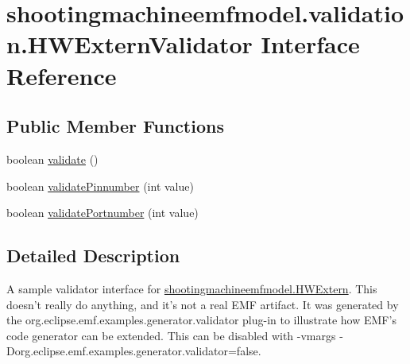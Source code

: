 \hypertarget{interfaceshootingmachineemfmodel_1_1validation_1_1_h_w_extern_validator}{\section{shootingmachineemfmodel.\-validation.\-H\-W\-Extern\-Validator Interface Reference}
\label{interfaceshootingmachineemfmodel_1_1validation_1_1_h_w_extern_validator}
}
\subsection*{Public Member Functions}
\begin{DoxyCompactItemize}
\item 
boolean \hyperlink{interfaceshootingmachineemfmodel_1_1validation_1_1_h_w_extern_validator_a9058e968627a636b5aaf06147a04384b}{validate} ()
\item 
boolean \hyperlink{interfaceshootingmachineemfmodel_1_1validation_1_1_h_w_extern_validator_a49e54ec2c3cfe73f5067fd7897bc84af}{validate\-Pinnumber} (int value)
\item 
boolean \hyperlink{interfaceshootingmachineemfmodel_1_1validation_1_1_h_w_extern_validator_a83a1402705a0aa6d021d65f128fd537f}{validate\-Portnumber} (int value)
\end{DoxyCompactItemize}


\subsection{Detailed Description}
A sample validator interface for \hyperlink{interfaceshootingmachineemfmodel_1_1_h_w_extern}{shootingmachineemfmodel.\-H\-W\-Extern}. This doesn't really do anything, and it's not a real E\-M\-F artifact. It was generated by the org.\-eclipse.\-emf.\-examples.\-generator.\-validator plug-\/in to illustrate how E\-M\-F's code generator can be extended. This can be disabled with -\/vmargs -\/\-Dorg.\-eclipse.\-emf.\-examples.\-generator.\-validator=false. 

